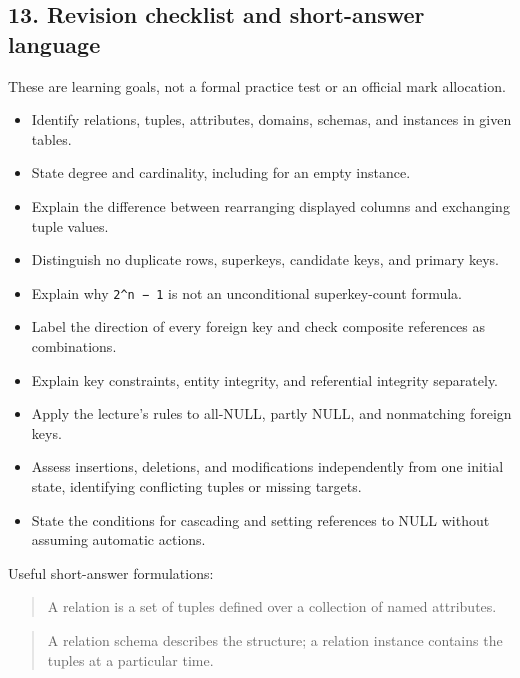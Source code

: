 \subsection{13. Revision checklist and short-answer language}\label{03_relational_model_and_integrity_en-revision-checklist-and-short-answer-language}

These are learning goals, not a formal practice test or an official mark allocation.

\begin{itemize}
\tightlist
\item[$\square$]
  Identify relations, tuples, attributes, domains, schemas, and instances in given tables.
\item[$\square$]
  State degree and cardinality, including for an empty instance.
\item[$\square$]
  Explain the difference between rearranging displayed columns and exchanging tuple values.
\item[$\square$]
  Distinguish no duplicate rows, superkeys, candidate keys, and primary keys.
\item[$\square$]
  Explain why \texttt{2\^{}n\ −\ 1} is not an unconditional superkey-count formula.
\item[$\square$]
  Label the direction of every foreign key and check composite references as combinations.
\item[$\square$]
  Explain key constraints, entity integrity, and referential integrity separately.
\item[$\square$]
  Apply the lecture's rules to all-NULL, partly NULL, and nonmatching foreign keys.
\item[$\square$]
  Assess insertions, deletions, and modifications independently from one initial state, identifying conflicting tuples or missing targets.
\item[$\square$]
  State the conditions for cascading and setting references to NULL without assuming automatic actions.
\end{itemize}

Useful short-answer formulations:

\begin{quote}
A relation is a set of tuples defined over a collection of named attributes.
\end{quote}

\begin{quote}
A relation schema describes the structure; a relation instance contains the tuples at a particular time.
\end{quote}

